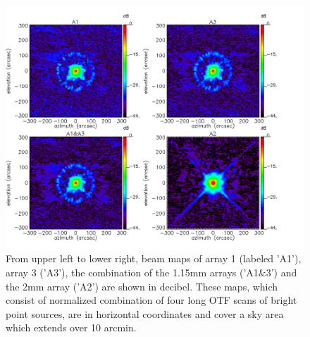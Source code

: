 \begin{figure}[!thbp]
\begin{center}
  \includegraphics[trim=0cm 0cm 2.5cm 0cm, clip=true, width=\linewidth]{Figures/Lobe_map_Combo_v2_dB.pdf}
 \caption[Beam pattern.]{From upper left to lower right, beam maps of array 1 (labeled 'A1'), array 3 ('A3'), the combination of the 1.15mm arrays ('A1$\&$3') and the 2mm array ('A2') are shown in decibel. These maps, which consist of normalized combination of four long OTF scans of bright point sources, are in horizontal coordinates and cover a sky area which extends over 10 arcmin.}
\label{fig:beam}
\end{center}
\end{figure}

